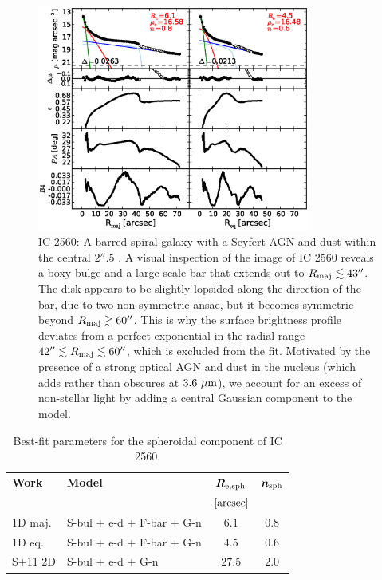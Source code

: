 \documentclass[preprint2]{emulateapj}
\newcommand{\fitfigurewidth}{0.8\textwidth}
\begin{document}
  \begin{figure}[h]
  \begin{center}
  \includegraphics[width=\fitfigurewidth]{images/ic2560_1Dfit.eps}
  \caption{IC 2560: A barred spiral galaxy with a Seyfert AGN \citep{veroncettyveron2006}
  and dust within the central $2''.5$ \citep{martini2003}.
  A visual inspection of the image of IC 2560 reveals a boxy bulge and
  a large scale bar that extends out to $R_{\rm maj} \lesssim 43''$.
  The disk appears to be slightly lopsided along the direction of the bar,
  due to two non-symmetric ansae, but it becomes symmetric beyond $R_{\rm maj} \gtrsim 60''$. 
  This is why the surface brightness profile deviates from a perfect exponential
  in the radial range $42'' \lesssim R_{\rm maj} \lesssim 60''$, which is excluded from the fit.
  Motivated by the presence of a strong optical AGN and dust in the nucleus (which adds rather than obscures at $3.6\rm~\mu m$), 
  we account for an excess of non-stellar light by adding a central Gaussian component to the model.}
  \end{center}
  \end{figure}

  \begin{table}[h]
  \small
  \caption{Best-fit parameters for the spheroidal component of IC 2560.}
  \begin{center}
  \begin{tabular}{llcc}
  \hline
  {\bf Work} & {\bf Model}   & $\bm R_{\rm e,sph}$    & $\bm n_{\rm sph}$ \\
    &  &  $[\rm arcsec]$ & \\
  \hline
  1D maj. & S-bul + e-d + F-bar + G-n & $6.1$  &  $0.8$ \\
  1D eq.  & S-bul + e-d + F-bar + G-n & $4.5$  &  $0.6$ \\
  \hline
  S+11 2D         & S-bul + e-d + G-n & $27.5$  &  $2.0$ \\
  \hline
  \end{tabular}
  \end{center}
  \label{tab:ic2560}
  \end{table}
\end{document}
